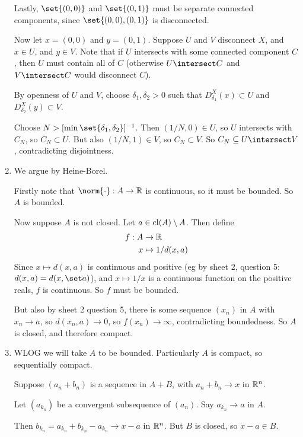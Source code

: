 \documentclass[a4paper,12pt,fleqn]{article}
\begin{document}
\begin{enumerate}[label=\arabic*.,leftmargin=*]
  Lastly, \(\set{(0, 0)}\) and \(\set{(0, 1)}\) must be separate connected
  components, since \(\set{(0, 0), (0, 1)}\) is disconnected.

  Now let \(x = (0, 0)\) and \(y = (0, 1)\). Suppose \(U\) and \(V\) disconnect
  \(X\), and \(x \in U\), and \(y \in V\). Note that if \(U\) intersects with
  some connected component \(C\), then \(U\) must contain all of \(C\)
  (otherwise \(U \intersect C\) and \(V \intersect C\) would disconnect \(C\)).

  By openness of \(U\) and \(V\), choose \(\delta_1, \delta_2 > 0\) such that
  \(D_{\delta_1}^X(x) \subset U\) and \(D_{\delta_2}^X(y) \subset V\).

  Choose \(N > [\min \set{\delta_1, \delta_2}]^{-1}\). Then \((1/N, 0) \in U\),
  so \(U\) intersects with \(C_N\), so \(C_N \subset U\).
  But also \((1/N, 1) \in V\), so \(C_N \subset V\). So
  \(C_N \subset U \intersect V\), contradicting disjointness.
 \item
  We argue by Heine-Borel.

  Firstly note that \(\norm{\cdot}: A \to \R\) is continuous, so it must be
  bounded. So \(A\) is bounded.

  Now suppose \(A\) is not closed. Let \(a \in \operatorname{cl}(A) \setminus A\). Then define
  \begin{align*}
   f: A &\to \mathbb R \\
   x &\mapsto 1 / d(x, a)
  \end{align*}
  Since \(x \mapsto d(x, a)\) is continuous and positive
  (eg by sheet 2, question 5: \(d(x, a) = d(x, \set a)\)), and
  \(x \mapsto 1 / x\) is a continuous function on the positive reals, \(f\) is
  continuous. So \(f\) must be bounded.

  But also by sheet 2 question 5, there is some sequence \((x_n)\) in \(A\) with
  \(x_n \to a\), so \(d(x_n, a) \to 0\), so \(f(x_n) \to \infty\), contradicting
  boundedness. So \(A\) is closed, and therefore compact.
 \item
  WLOG we will take \(A\) to be bounded. Particularly \(A\) is compact, so
  sequentially compact.

  Suppose \((a_n + b_n)\) is a sequence in \(A + B\), with \(a_n + b_n \to x\)
  in \(\mathbb R^n\).

  Let \((a_{k_n})\) be a convergent subsequence of \((a_n)\). Say
  \(a_{k_n} \to a\) in \(A\).

  Then \(b_{k_n} = a_{k_n} + b_{k_n} - a_{k_n} \to x - a\) in \(\mathbb R^n\). But
  \(B\) is closed, so \(x - a \in B\).


\end{enumerate}
\end{document}
